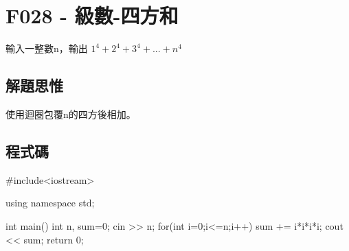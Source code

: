 \section{F028 - 級數-四方和}
輸入一整數n，輸出 $1^4+2^4+3^4+...+n^4$
\subsection{解題思惟}
使用迴圈包覆n的四方後相加。
\subsection{程式碼}
\begin{cppcode}
#include<iostream>

using namespace std;

int main()
{
	int n, sum=0;
	cin >> n;
	for(int i=0;i<=n;i++) {
		sum += i*i*i*i;
	}
	cout << sum;
	return 0;
}
\end{cppcode}
